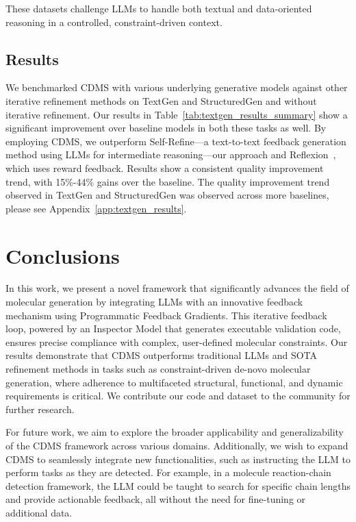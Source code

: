 \documentclass[10pt]{article} %
\begin{document}
    These datasets challenge LLMs to handle both textual and data-oriented reasoning in a controlled, constraint-driven context.
    
    \subsection{Results}
    We benchmarked CDMS with various underlying generative models against other iterative refinement methods on TextGen and StructuredGen and without iterative refinement. Our results in Table~\ref{tab:textgen_results_summary} show a significant improvement over baseline models in both these tasks as well.  By employing CDMS, we outperform Self-Refine—a text-to-text feedback generation method using LLMs for intermediate reasoning—our approach and Reflexion~\cite{shinn2023reflexion}, which uses reward feedback. Results show a consistent quality improvement trend, with 15\%-44\% gains over the baseline. The quality improvement trend observed in TextGen and StructuredGen was observed across more baselines, please see Appendix~\ref{app:textgen_results}.

    
    \section{Conclusions}
    In this work, we present a novel framework that significantly advances the field of molecular generation by integrating LLMs with an innovative feedback mechanism using Programmatic Feedback Gradients. This iterative feedback loop, powered by an Inspector Model that generates executable validation code, ensures precise compliance with complex, user-defined molecular constraints. Our results demonstrate that CDMS outperforms traditional LLMs and SOTA refinement methods in tasks such as constraint-driven de-novo molecular generation, where adherence to multifaceted structural, functional, and dynamic requirements is critical.
    We contribute our code and dataset to the community for further research.

    For future work, we aim to explore the broader applicability and generalizability of the CDMS framework across various domains. Additionally, we wish to expand CDMS to seamlessly integrate new functionalities, such as instructing the LLM to perform tasks as they are detected. For example, in a molecule reaction-chain detection framework, the LLM could be taught to search for specific chain lengths and provide actionable feedback, all without the need for fine-tuning or additional data. %
\end{document}
